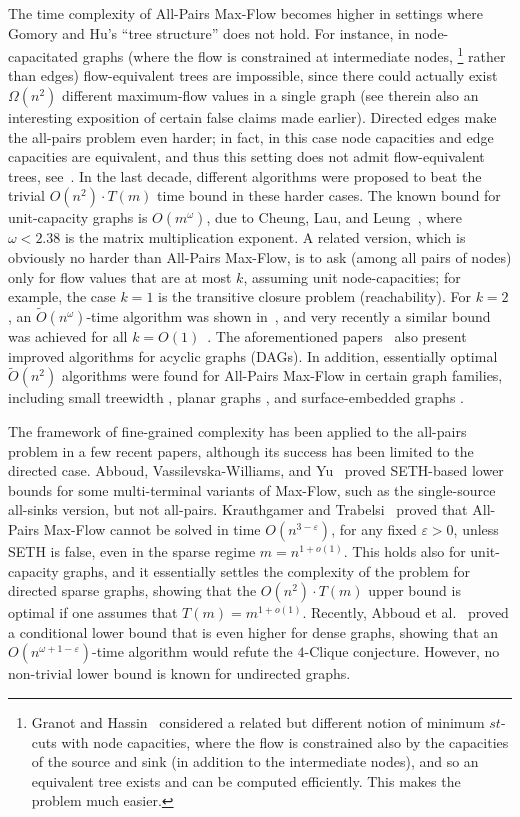 \documentclass{toc}
\theoremstyle{plain}
\newcommand{\ProblemName}[1]{\textsf{#1}}
\newcommand{\MF}{\ProblemName{Max-Flow}\xspace}
\newcommand{\SETH}{SETH\xspace}
\newcommand{\APMF}{\ProblemName{All-Pairs Max-Flow}\xspace}
\newcommand\eps{\varepsilon}
\newcommand\tO{\ensuremath{\widetilde O}}  %
\begin{document}
The time complexity of \APMF becomes higher in settings
where Gomory and Hu's ``tree structure'' \cite{GH61} does not hold.
For instance, in node-capacitated graphs
(where the flow is constrained at intermediate nodes,%
\footnote{Granot and Hassin~\cite{GH86} considered
  a related but different notion of minimum $st$-cuts with node capacities,
  where the flow is constrained also by the capacities of the source and sink (in addition to
the  %
intermediate nodes), and so an equivalent tree exists and can be computed efficiently.
%
%
%
%
  This makes the problem much easier.
}
rather than edges) flow-equivalent trees are impossible,
since there could actually exist $\Omega(n^2)$ different maximum-flow values
in a single graph \cite{HL07} (see therein
also an interesting exposition of certain false claims made earlier).
Directed edges make the all-pairs problem even harder;
in fact, in this case node capacities and edge capacities are equivalent,
and thus this setting does not admit flow-equivalent trees,
see~\cite{Mayeda62,Jelinek63,HL07}.
In the last decade, different algorithms were proposed to beat the trivial $O(n^2)\cdot T(m)$ time bound in these harder cases.
The known bound for
%
unit-capacity graphs
is $O(m^\omega)$, due to Cheung, Lau, and Leung~\cite{CLL13},
where $\omega<2.38$ is the matrix multiplication exponent.
A related version, which is obviously no harder than \APMF,
is to ask (among all pairs of nodes) only for flow values that are at most $k$,
assuming unit node-capacities;
for example, the case $k=1$ is the transitive closure problem (reachability).
For $k=2$, an $\tO(n^\omega)$-time algorithm was shown in~\cite{G+17},
and very recently a similar bound was achieved for all $k=O(1)$~\cite{A+18}.
The aforementioned papers~\cite{CLL13,G+17,A+18}
also present improved algorithms for acyclic graphs (DAGs).
In addition, essentially optimal %
${\tO}(n^2)$    %
algorithms were found for \APMF in certain graph families,
including small treewidth \cite{ACZ98},
planar graphs \cite{LNSW12}, and
surface-embedded graphs \cite{BENW16}.


The framework of fine-grained complexity has been applied to the all-pairs problem in a few recent papers, although its success has been limited to the directed case.
Abboud, Vassilevska-Williams, and Yu~\cite{AVY15} proved \SETH-based lower bounds for some multi-terminal variants of \MF,
such as the single-source all-sinks version, but not all-pairs.
Krauthgamer and Trabelsi~\cite{KT18} proved that \APMF cannot be solved
in time $O(n^{3-\eps})$, for any fixed $\eps>0$, unless \SETH is false,
even in the sparse regime $m = n^{1+o(1)}$.
This holds also for unit-capacity graphs, and it essentially settles the complexity of the problem for directed sparse graphs, showing that the $O(n^2 )\cdot T(m)$ upper bound is optimal if one assumes that $T(m) = m^{1+o(1)}$.
Recently, Abboud et al.~\cite{A+18} proved a conditional lower bound that
is even higher for dense graphs,
showing that an $O(n^{\omega+1-\eps})$-time algorithm
would refute the $4$-Clique conjecture.
However, no non-trivial lower bound is known for undirected graphs.
\end{document}
